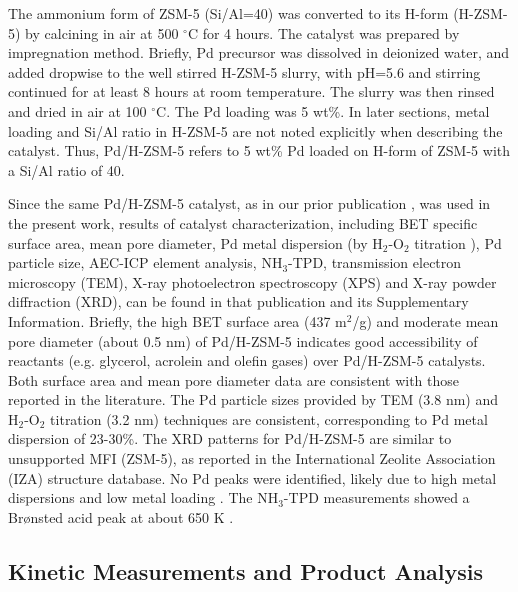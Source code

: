 \documentclass[journal=iecred,manuscript=article]{achemso}
\begin{document}
The ammonium form of ZSM-5 (Si/Al=40) was converted to its H-form (H-ZSM-5) by calcining in air at 500 $^{\circ}$C for 4 hours. \cite{Chiang2010, Iorio2015}
The catalyst was prepared by impregnation method.
Briefly, Pd precursor was dissolved in deionized water, and added dropwise to the well stirred H-ZSM-5 slurry,
with pH=5.6 and stirring continued for at least 8 hours at room temperature.
The slurry was then rinsed and dried in air at 100 $^{\circ}$C.
The Pd loading was 5 wt\%.
In later sections, metal loading and Si/Al ratio in H-ZSM-5 are not noted explicitly when describing the catalyst.
Thus, Pd/H-ZSM-5 refers to 5 wt\% Pd loaded on H-form of ZSM-5 with a Si/Al ratio of 40.

Since the same Pd/H-ZSM-5 catalyst, as in our prior publication \cite{Xiao2016},
was used in the present work, results of catalyst characterization, including BET specific surface area, mean pore diameter, Pd metal dispersion (by H$_2$-O$_2$ titration \cite{Benson1965}),
Pd particle size, AEC-ICP element analysis, NH$_3$-TPD, transmission electron microscopy (TEM), X-ray photoelectron spectroscopy (XPS) and X-ray powder diffraction (XRD), can be found in that publication and its Supplementary Information.
Briefly, the high BET surface area (437 m$^2$/g) and moderate mean pore diameter (about 0.5 nm) of Pd/H-ZSM-5 indicates good accessibility of reactants (e.g. glycerol, acrolein and olefin gases) over Pd/H-ZSM-5 catalysts.
Both surface area and mean pore diameter data are consistent with those reported in the literature. \cite{Serrano-Ruiz2011, Olson1981}
The Pd particle sizes provided by TEM (3.8 nm) and H$_2$-O$_2$ titration (3.2 nm) techniques are consistent, corresponding to Pd metal dispersion of 23-30\%.
The XRD patterns for Pd/H-ZSM-5 are similar to unsupported MFI (ZSM-5), as reported in the International Zeolite Association (IZA) structure database. \cite{Baerlocher2007}
No Pd peaks were identified, likely due to high metal dispersions and low metal loading \cite{Zhu2013}.
The NH$_3$-TPD measurements showed a Br{\o}nsted acid peak at about 650 K \cite{Iorio2015}.


\subsection{Kinetic Measurements and Product Analysis}
\end{document}
